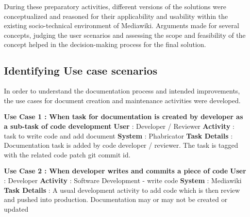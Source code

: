 During these preparatory activities, different versions of the solutions were conceptualized and reasoned for their applicability and usability within the existing socio-technical environment of Mediawiki.
Arguments made for several concepts, judging the user scenarios and assessing the scope and feasibility of the concept helped in the decision-making process for the final solution.


\subsection{Identifying Use case scenarios }
In order to understand the documentation process and intended improvements, the use cases for document creation and maintenance activities were developed.
\newline \newline
\begin{mdframed}[leftmargin=10pt,rightmargin=-10pt]
\textbf{Use Case 1 : When task for documentation is created by developer as a sub-task of code development}
\newline\newline \indent \textbf{User} : Developer / Reviewer
\newline \newline \indent \textbf{Activity} : task to write code and add document
\newline \newline \indent \textbf{System} : Phabricator
\newline \newline \indent \textbf{Task Details} : Documentation task is added by code developer / reviewer. The task is tagged with the related code patch git commit id.
\end{mdframed}

\begin{mdframed}[leftmargin=10pt,rightmargin=-10pt]
\textbf{Use Case 2 : When developer writes and commits a piece of code}
\newline \newline \indent \textbf{User} : Developer
\newline \newline \indent \textbf{Activity} : Software Development - write code
\newline \newline \indent \textbf{System} : Mediawiki
\newline \newline \indent \textbf{Task Details} : A usual development activity to add code which is then review and pushed into production. Documentation may or may not be created or updated
\end{mdframed}

